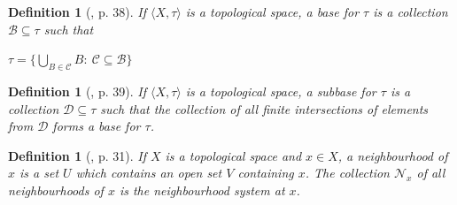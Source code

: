 \documentclass[12pt, oneside]{book}
\newtheorem{definition}[theorem]{Definition}
\begin{document}

\begin{definition}[\cite{W2}, p. 38] 
\normalfont
\noindent If $\langle X, \tau \rangle$ is a topological space, a {\sl base} for $\tau$ is a collection $\mathscr{B} \subseteq \tau$ such that 
\begin{center}
$ \tau = \Big \{ \bigcup_{B \in \mathscr{C}} B : \ \mathscr{C} \subseteq \mathscr{B} \Big \} $
\end{center}
\end{definition}

\begin{definition}[\cite{W2}, p. 39] 
\normalfont
If $\langle X, \tau \rangle$ is a topological space, a {\sl subbase} for $\tau$ is a collection 
$\mathscr{D} \subseteq \tau$ such that the collection of all finite intersections of elements from 
$\mathscr{D}$ forms a base for $\tau$.

\end{definition}



\begin{definition}[\cite{W2}, p. 31] 
\normalfont
If $X$ is a topological space and $x \in X$, a {\sl neighbourhood} of $x$ is a set $U$ which contains 
an open set $V$ containing $x$. The collection $\mathcal{N}_x$ of all neighbourhoods of $x$ is the 
{\sl neighbourhood system} at $x$. 
\end{definition}
\end{document}
